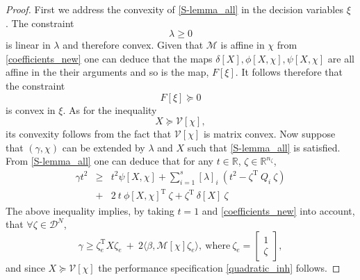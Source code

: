 \documentclass[letterpaper,11pt]{article}
\newcommand{\AR}[2]{\left[\begin{array}{#1}#2\end{array}\right]}
\newcommand{\T}{\mathrm{T}}
\newtheorem{proof}{Proof}
\begin{document}
\begin{proof}
	First we address the convexity of \eqref{S-lemma_all} in the decision variables 	
	$\xi$ .
	The constraint  $$ \lambda \geq 0 $$ is linear in 
	$  \lambda$ and therefore convex. 
	Given that $\mathcal{M}$ is affine in $ \chi$ 
	from
	\eqref{coefficients_new} one can deduce that the maps 
	$ 
	\delta[ X], \phi[ X, \chi ],
	\psi[ X,\chi]
	$
	are all affine in the their arguments and so is the map,
	$
	F[\xi].
	$
	It follows therefore that the constraint 
	$$
	F[\xi]  \succeq 0
	$$
	is convex in $\xi$. 
	As for the inequality 
	\begin{equation}
	\label{matrix_convex_ineq}
	X \succeq  \mathcal{V}[\chi],
	\end{equation}
	its convexity follows from the fact that $\mathcal{V}[\chi]$
	is matrix convex. 
	Now suppose that   $ (\gamma, \chi) $ can 
	be extended by $  \lambda $ and $ X$ such that
	\eqref{S-lemma_all} is satisfied.  From \eqref{S-lemma_all} one can deduce that 
	for any $t \in \mathbb{R}$, $ \zeta \in \mathbb{R}^{n_{\zeta}}$,
	\begin{eqnarray}
	\label{quadratic_form_lagrange_relaxed}
	\nonumber 
	\gamma t^2 & \geq &   t^2 \psi[X,  \chi ] + \sum_{i=1}^s 
	[\lambda]_i ~ ( t^2 - \zeta^\T ~   Q_{i} ~
	\zeta ) \\
	&+ & 2 ~ t ~ \phi[X,  \chi ]^{\T} ~\zeta + 
	\zeta^\T ~ \delta[X]   ~\zeta  
	\end{eqnarray}
	The above inequality implies, by taking $t=1$ and \eqref{coefficients_new} into account,  that $ 
	\forall     \zeta \in \mathscr{D}^N$,
	\begin{equation}
	\label{bounding}
	\gamma  \geq 
	\zeta_e^\T  X \zeta_e ~+~ 2 \langle \beta,  
	\mathcal{M}[ \chi]  \zeta_e \rangle, ~ \text{where}~    \zeta_e = \AR{c}{1 \\  \zeta },
	\end{equation}
	and since $ X  \succeq  \mathcal{V}[ \chi] $
	the performance specification
	\eqref{quadratic_inh} follows.
	

\end{proof}
\end{document}
